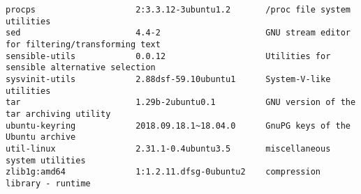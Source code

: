 \begin{tcolorbox}[breakable,colback=yellow!5!black]
\begin{verbatim}
procps                    2:3.3.12-3ubuntu1.2       /proc file system utilities
sed                       4.4-2                     GNU stream editor for filtering/transforming text
sensible-utils            0.0.12                    Utilities for sensible alternative selection
sysvinit-utils            2.88dsf-59.10ubuntu1      System-V-like utilities
tar                       1.29b-2ubuntu0.1          GNU version of the tar archiving utility
ubuntu-keyring            2018.09.18.1~18.04.0      GnuPG keys of the Ubuntu archive
util-linux                2.31.1-0.4ubuntu3.5       miscellaneous system utilities
zlib1g:amd64              1:1.2.11.dfsg-0ubuntu2    compression library - runtime
\end{verbatim}
\endgroup
\end{tcolorbox}
